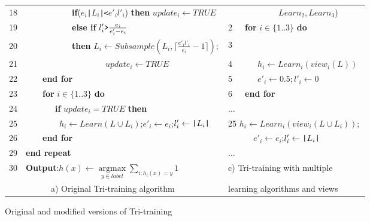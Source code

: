 \documentclass[english]{jnlp_1.4}
\begin{document}
\begin{figure}[b]
\begin{tabular}{|l|l|}
    18\ \ \ \ \ \ \ \ \ \ \ \ \ \textbf{if}($e_{i}$\verb"|"$L_{i}$\verb"|<"$e'_{i}l'_{i}$) \textbf{then} $update_{i} \leftarrow TRUE$  & \ \ \ \ \ \ \ \ \ \ \ \ $Learn_{2},Learn_{3}$)   \\
    19\ \ \ \ \ \ \ \ \ \ \ \ \ \textbf{else if} $l'_{i}\verb">"\frac{e_{i}}{e'_{i}-e_{i}}$  & 2\ \ \ \textbf{for} $i \in \{1..3\}$ \textbf{do} \\
    20\ \ \ \ \ \ \ \ \ \ \ \ \ \textbf{then} $L_{i}\leftarrow Subsample(L_{i},\lceil \frac{e'_{i}l'_{i}}{e_{i}}-1 \rceil);$  & 3\  \\
    21\ \ \ \ \ \ \ \ \ \ \ \ \ \ \ \ \ \ \ \ \ $update_{i}\leftarrow TRUE$  &  4\ \ \ \ \ \ $h_{i} \leftarrow Learn_{i}(view_{i}(L))$ \\
    22\ \ \ \ \ \ \textbf{end for}  &  5\ \ \ \ \ \ $e'_{i} \leftarrow 0.5; l'_{i} \leftarrow 0$  \\
    23\ \ \ \ \ \ \textbf{for} $i \in \{1..3\}$ \textbf{do}  &  6\ \ \ \textbf{end for} \\
    24\ \ \ \ \ \ \ \ \ \textbf{if} $update_{i}=TRUE$ \textbf{then}  & $\ldots$ \\
    25\ \ \ \ \ \ \ \ \ \ $h_{i} \leftarrow Learn(L \cup L_{i})$;$e'_{i} \leftarrow e_{i}$;$l'_{i}\leftarrow \verb"|"L_{i}\verb"|"$  & 25 $h_{i}\leftarrow Learn_{i}(view_{i}(L\cup L_{i}));$    \\
    26\ \ \ \ \ \ \textbf{end for}  &  \ \ \ \ \ \ $e'_{i} \leftarrow e_{i}$;$l'_{i}\leftarrow \verb"|"L_{i}\verb"|"$  \\
    29\ \ \textbf{end repeat}  & $\ldots$ \\
    30\ \ \textbf{Output}:$h(x)\leftarrow\mathop {\arg \max}\limits_{y \in label}\sum\limits_{i:h_{i}(x)=y} 1$    & \textsf{c) Tri-training with multiple}  \\
    \ \ \ \ \ \ \ \ \ \ \textsf{a) Original Tri-training algorithm} & \textsf{learning algorithms and views}  \\
\hline
\end{tabular}
\caption{Original and modified versions of Tri-training}
\label{tab:algorithm}
\end{figure}
\end{document}

